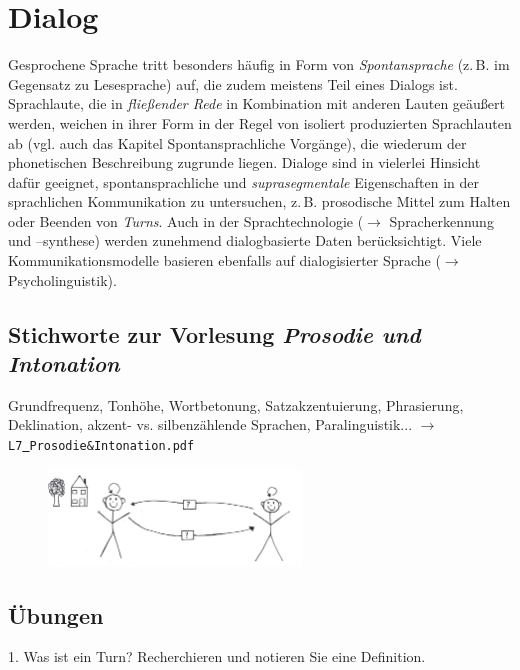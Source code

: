 \documentclass[11pt]{book}
\begin{document}
\chapter{Dialog}
Gesprochene Sprache tritt besonders häufig in Form von \textit{Spontansprache} (z.\,B. im Gegensatz zu Lesesprache) auf, die zudem meistens Teil eines Dialogs ist. Sprachlaute, die in \textit{fließender Rede} in Kombination mit anderen Lauten geäußert werden, weichen in ihrer Form in der Regel von isoliert produzierten Sprachlauten ab (vgl. auch das Kapitel Spontansprachliche Vorgänge), die wiederum der phonetischen Beschreibung zugrunde liegen. Dialoge sind in vielerlei Hinsicht dafür geeignet, spontansprachliche und \textit{suprasegmentale} Eigenschaften in der sprachlichen Kommunikation zu untersuchen, z.\,B. prosodische Mittel zum Halten oder Beenden von \textit{Turns}. Auch in der Sprachtechnologie ($\rightarrow$ Spracherkennung und –synthese) werden zunehmend dialogbasierte Daten berücksichtigt. Viele Kommunikationsmodelle basieren ebenfalls auf dialogisierter Sprache ($\rightarrow$ Psycholinguistik).

\section{Stichworte zur Vorlesung \em{Prosodie und Intonation}}
Grundfrequenz, Tonhöhe, Wortbetonung, Satzakzentuierung, Phrasierung, Deklination, akzent- vs. silbenzählende Sprachen, Paralinguistik... $\rightarrow$ {\tt L7\underline{\ }Prosodie{\&}Intonation.pdf}

\begin{figure}[htbp]
\begin{center}
\includegraphics[width=0.6\textwidth]{grafiken/dialog/dialog}
\label{t5}
\end{center}
\end{figure}


\newpage
\section{Übungen}
1.	Was ist ein Turn? Recherchieren und notieren Sie eine Definition.
\vspace*{3cm}\\
\end{document}
